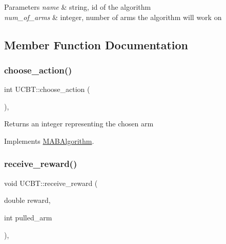 \begin{DoxyParams}{Parameters}
{\em name} & string, id of the algorithm \\
\hline
{\em num\+\_\+of\+\_\+arms} & integer, number of arms the algorithm will work on \\
\hline
\end{DoxyParams}


\subsection{Member Function Documentation}
\mbox{\label{class_u_c_b_t_a6bebf23b2dd926e49794a4fb0fefe358}} 
\subsubsection{\texorpdfstring{choose\+\_\+action()}{choose\_action()}}
{\footnotesize\ttfamily int U\+C\+B\+T\+::choose\+\_\+action (\begin{DoxyParamCaption}{ }\end{DoxyParamCaption})\hspace{0.3cm}{\ttfamily [override]}, {\ttfamily [virtual]}}

\begin{DoxyReturn}{Returns}
an integer representing the chosen arm 
\end{DoxyReturn}


Implements \mbox{\hyperlink{class_m_a_b_algorithm_afb48f01df0e1860d19759f6e20335007}{M\+A\+B\+Algorithm}}.

\mbox{\label{class_u_c_b_t_a0e9b24c391f3934e59809419e0b04e52}} 
\subsubsection{\texorpdfstring{receive\+\_\+reward()}{receive\_reward()}}
{\footnotesize\ttfamily void U\+C\+B\+T\+::receive\+\_\+reward (\begin{DoxyParamCaption}\item[{double}]{reward,  }\item[{int}]{pulled\+\_\+arm }\end{DoxyParamCaption})\hspace{0.3cm}{\ttfamily [override]}, {\ttfamily [virtual]}}




